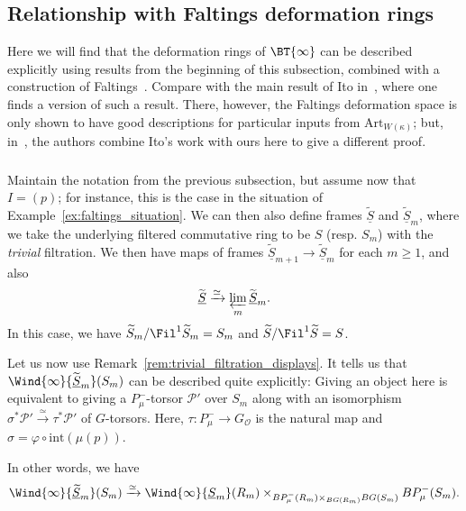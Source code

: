 \documentclass[10pt]{amsart}
\begin{document}
\subsection{Relationship with Faltings deformation rings}
\label{subsec:deformation_rings}
Here we will find that the deformation rings of $\BT{\infty}$ can be described explicitly using results from the beginning of this subsection, combined with a construction of Faltings~\cite[\S 7]{faltings:very_ramified}. Compare with the main result of Ito in~\cite{ito2023deformation}, where one finds a version of such a result. There, however, the Faltings deformation space is only shown to have good descriptions for particular inputs from $\mathrm{Art}_{W(\kappa)}$; but, in~\cite{imai2023prismatic}, the authors combine Ito's work with ours here to give a different proof.

\subsubsection{}
Maintain the notation from the previous subsection, but assume now that $I = (p)$; for instance, this is the case in the situation of Example~\ref{ex:faltings_situation}.  We can then also define frames $\widetilde{\underline{S}}$ and $\widetilde{\underline{S}}_m$, where we take the underlying filtered commutative ring to be $S$ (resp. $S_m$) with the \emph{trivial} filtration. We then have maps of frames $\widetilde{\underline{S}}_{m+1}\to \widetilde{\underline{S}}_m$ for each $m\ge 1$, and also
    \[
     \widetilde{\underline{S}}\xrightarrow{\simeq}\varprojlim_{m}\widetilde{\underline{S}}_m.
    \]
In this case, we have $\widetilde{S}_m/\Fil^1\widetilde{S}_m = S_m$ and $\widetilde{S}/\Fil^1\widetilde{S} = S$.

Let us now use Remark~\ref{rem:trivial_filtration_displays}. It tells us that $\Wind{\infty}{\widetilde{\underline{S}}_m}(S_m)$ can be described quite explicitly: Giving an object here is equivalent to giving a $P^-_\mu$-torsor $\mathcal{P}'$ over $S_m$ along with an isomorphism $\sigma^* \mathcal{P}'\xrightarrow{\simeq}\tau^* \mathcal{P}'$ of $G$-torsors. Here, $\tau:P^-_\mu\to G_{\mathcal{O}}$ is the natural map and $\sigma = \varphi\circ \mathrm{int}(\mu(p))$.

In other words, we have
\begin{align}
\label{eqn:s_to_tilde_s_cartesian}
\Wind{\infty}{\underline{\widetilde{S}}_m}(S_m)\xrightarrow{\simeq}\Wind{\infty}{\underline{S}_m}(R_m)\times_{BP^-_\mu(R_m)\times_{BG(R_m)}BG(S_m)}BP^-_\mu(S_m).
\end{align}
\end{document}
